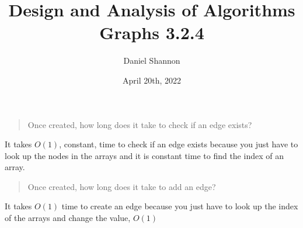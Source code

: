 \documentclass[12pt, letterpaper, twoside]{article}
\title{%
Design and Analysis of Algorithms\\
\large Graphs 3.2.4
}
\author{Daniel Shannon}
\date{April 20th, 2022}
\begin{document}
\begin{titlepage}
\maketitle
\end{titlepage}
\begin{quote}
    Once created, how long does it take to check if an edge exists?
\end{quote}
It takes $O(1)$, constant, time to check if an edge exists because you just have to look up the nodes in the arrays and it is constant time to find the index of an array.
\begin{quote}
    Once created, how long does it take to add an edge?
\end{quote}
It takes $O(1)$ time to create an edge because you just have to look up the index of the arrays and change the value, $O(1)$
\end{document}
